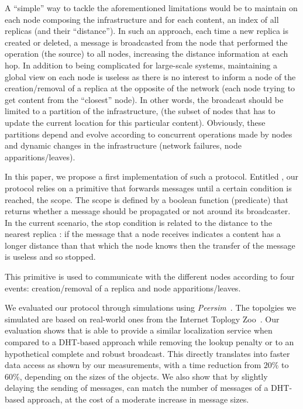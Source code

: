 A ``simple'' way to tackle the aforementioned limitations would be to
maintain on each node composing the infrastructure and for each
content, an index of all replicas (and their ``distance'').  In such
an approach, each time a new replica is created or deleted, a message
is broadcasted from the node that performed the operation (\ie the
source) to all nodes, increasing the distance information at each hop.
%
In addition to being complicated for large-scale systems, maintaining
a global view on each node is useless as there is no interest to
inform a node of the creation/removal of a replica at the opposite of
the network (each node trying to get content from the ``closest''
node).  In other words, the broadcast should be limited to a partition
of the infrastructure, (\ie the subset of nodes that has to update the
current location for this particular content). Obviously, these
partitions depend and evolve according to concurrent operations made by nodes and
dynamic changes in the infrastructure (network failures, node
apparitions/leaves).

In this paper, we propose a first implementation of such a protocol.
Entitled \NAME, our protocol relies on a primitive that forwards
messages until a certain condition is reached, \ie the scope. The
scope is defined by a boolean function (predicate) that returns
whether a message should be propagated or not around its
broadcaster. In the current scenario, the stop condition is related to
the distance to the nearest replica : if the message that a node receives
indicates a content has a longer distance than that which the node
knows then the transfer of the message is useless and so stopped.
%

This primitive is used to communicate with the different nodes
according to four events: creation/removal of a replica and node
apparitions/leaves. 


We evaluated our protocol through simulations using \textit{Peersim}~\cite{montresor2009peersim}. The topolgies we simulated are based on real-world ones from the Internet Toplogy
Zoo~\cite{knight2011internet}.  Our evaluation shows that \NAME is able to
provide a similar localization service when compared to a DHT-based
approach while removing the lookup penalty or to an hypothetical complete and robust broadcast. This directly translates
into faster data access as shown by our measurements, with a time
reduction from $20\%$ to $60\%$, depending on the sizes of the
objects. %
We also show that by slightly delaying the sending of messages, \NAME
can match the number of messages of a DHT-based approach, at the cost
of a moderate increase in message sizes.

